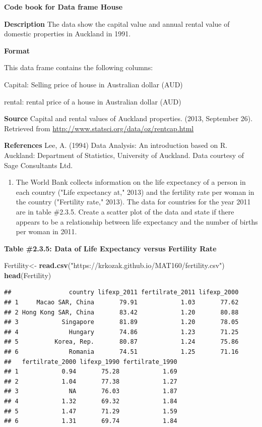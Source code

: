 \documentclass[]{book}
\newenvironment{Shaded}{\begin{snugshade}}{\end{snugshade}}
\newcommand{\KeywordTok}[1]{\textcolor[rgb]{0.13,0.29,0.53}{\textbf{#1}}}
\newcommand{\NormalTok}[1]{#1}
\newcommand{\StringTok}[1]{\textcolor[rgb]{0.31,0.60,0.02}{#1}}
\providecommand{\tightlist}{%
  \setlength{\itemsep}{0pt}\setlength{\parskip}{0pt}}
\begin{document}
\textbf{Code book for Data frame House}

\textbf{Description}
The data show the capital value and annual rental value of domestic properties in Auckland in 1991.

\textbf{Format}

This data frame contains the following columns:

Capital: Selling price of house in Australian dollar (AUD)

rental: rental price of a house in Australian dollar (AUD)

\textbf{Source}
Capital and rental values of Auckland properties. (2013, September 26). Retrieved from
\url{http://www.statsci.org/data/oz/rentcap.html}

\textbf{References}
Lee, A. (1994) Data Analysis: An introduction based on R. Auckland: Department of Statistics, University of Auckland. Data courtesy of Sage Consultants Ltd.

\begin{enumerate}
\def\labelenumi{\arabic{enumi}.}
\setcounter{enumi}{2}
\tightlist
\item
  The World Bank collects information on the life expectancy of a person in each country ("Life expectancy at," 2013) and the fertility rate per woman in the country ("Fertility rate," 2013). The data for countries for the year 2011 are in table \#2.3.5. Create a scatter plot of the data and state if there appears to be a relationship between life expectancy and the number of births per woman in 2011.
\end{enumerate}

\textbf{Table \#2.3.5: Data of Life Expectancy versus Fertility Rate}

\begin{Shaded}
\begin{Highlighting}[]
\NormalTok{Fertility<-}\StringTok{ }\KeywordTok{read.csv}\NormalTok{(}\StringTok{"https://krkozak.github.io/MAT160/fertility.csv"}\NormalTok{)}
\KeywordTok{head}\NormalTok{(Fertility)}
\end{Highlighting}
\end{Shaded}

\begin{verbatim}
##                country lifexp_2011 fertilrate_2011 lifexp_2000
## 1     Macao SAR, China       79.91            1.03       77.62
## 2 Hong Kong SAR, China       83.42            1.20       80.88
## 3            Singapore       81.89            1.20       78.05
## 4              Hungary       74.86            1.23       71.25
## 5          Korea, Rep.       80.87            1.24       75.86
## 6              Romania       74.51            1.25       71.16
##   fertilrate_2000 lifexp_1990 fertilrate_1990
## 1            0.94       75.28            1.69
## 2            1.04       77.38            1.27
## 3              NA       76.03            1.87
## 4            1.32       69.32            1.84
## 5            1.47       71.29            1.59
## 6            1.31       69.74            1.84
\end{verbatim}
\end{document}

